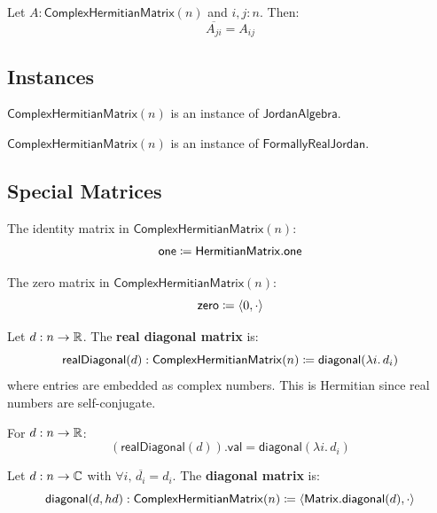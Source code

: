 \begin{theorem}
Let $A : \mathsf{ComplexHermitianMatrix}(n)$ and $i, j : n$. Then:
\[ \overline{A_{ji}} = A_{ij} \]
\end{theorem}

\subsection{Instances}

\begin{proposition}
$\mathsf{ComplexHermitianMatrix}(n)$ is an instance of $\mathsf{JordanAlgebra}$.
\end{proposition}

\begin{proposition}
$\mathsf{ComplexHermitianMatrix}(n)$ is an instance of $\mathsf{FormallyRealJordan}$.
\end{proposition}

\subsection{Special Matrices}

\begin{definition}[one]
The identity matrix in $\mathsf{ComplexHermitianMatrix}(n)$:
\[ \mathsf{one} \coloneqq \mathsf{HermitianMatrix.one} \]
\end{definition}

\begin{definition}[zero]
The zero matrix in $\mathsf{ComplexHermitianMatrix}(n)$:
\[ \mathsf{zero} \coloneqq \langle 0, \cdot \rangle \]
\end{definition}

\begin{definition}[realDiagonal]
Let $d : n \to \mathbb{R}$. The \textbf{real diagonal matrix} is:
\[ \mathsf{realDiagonal}(d) : \mathsf{ComplexHermitianMatrix}(n) \coloneqq \mathsf{diagonal}(\lambda i.\, d_i) \]
where entries are embedded as complex numbers. This is Hermitian since real numbers are self-conjugate.
\end{definition}

\begin{lemma}
For $d : n \to \mathbb{R}$:
\[ (\mathsf{realDiagonal}(d)).\mathsf{val} = \mathsf{diagonal}(\lambda i.\, d_i) \]
\end{lemma}

\begin{definition}[diagonal]
Let $d : n \to \mathbb{C}$ with $\forall i,\, \overline{d_i} = d_i$. The \textbf{diagonal matrix} is:
\[ \mathsf{diagonal}(d, hd) : \mathsf{ComplexHermitianMatrix}(n) \coloneqq \langle \mathsf{Matrix.diagonal}(d), \cdot \rangle \]
\end{definition}


